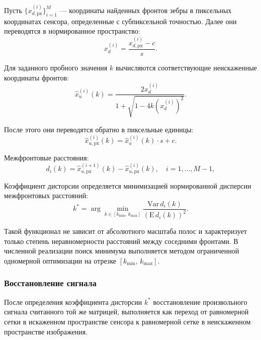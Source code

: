 Пусть $\{x_{d, \mathrm{px}}^{(i)}\}_{i=1}^{M}$ --- координаты найденных фронтов зебры в пиксельных координатах сенсора, определенные с субпиксельной точностью. Далее они переводятся в нормированное пространство:
\begin{equation}
x_d^{(i)} = \frac{x_{d,\mathrm{px}}^{(i)} - c}{s}.
\label{eq:zebra_edges_norm}
\end{equation}

Для заданного пробного значения $k$ вычисляются соответствующие неискаженные координаты фронтов:
\begin{equation}
\hat{x}_u^{(i)}(k) =
\frac{2x_d^{(i)}}{1 + \sqrt{1 - 4k\left(x_d^{(i)}\right)^2}}.
\label{eq:zebra_undistort}
\end{equation}

После этого они переводятся обратно в пиксельные единицы:
\begin{equation}
\hat{x}_{u,\mathrm{px}}^{(i)}(k) = \hat{x}_u^{(i)}(k)\cdot s + c.
\label{eq:zebra_undistort_px}
\end{equation}

Межфронтовые расстояния:
\begin{equation}
d_i(k) = \hat{x}_{u,\mathrm{px}}^{(i+1)}(k) - \hat{x}_{u,\mathrm{px}}^{(i)}(k),
\quad i=1,\ldots,M-1,
\label{eq:zebra_spacing}
\end{equation}

Коэффициент дисторсии определяется минимизацией нормированной дисперсии межфронтовых расстояний:
\begin{equation}
k^* = \arg\min_{k \in [k_{\min},\,k_{\max}]}
\frac{\mathrm{Var}\,d_i(k)}{\left(\mathrm{E}\,d_i(k)\right)^2}.
\label{eq:distortion_objective}
\end{equation}

Такой функционал не зависит от абсолютного масштаба полос и характеризует только степень неравномерности расстояний между соседними фронтами. В численной реализации поиск минимума выполняется методом ограниченной одномерной оптимизации на отрезке $[k_{\min},\,k_{\max}]$.

\subsubsection{Восстановление сигнала}

После определения коэффициента дисторсии $k^*$ восстановление произвольного сигнала считанного той же матрицей, выполняется как переход от равномерной сетки в искаженном пространстве сенсора к равномерной сетке в неискаженном пространстве изображения.

